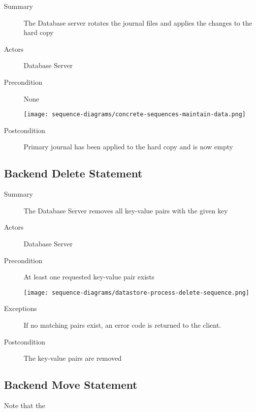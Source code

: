\documentclass[a4paper]{report}
\begin{document}
	\begin{description}
		\item[Summary] The Database server rotates the journal files and applies the changes to the hard copy
		\item[Actors] Database Server
		\item[Precondition] None

		\begin{center}
			\texttt{[image: sequence-diagrams/concrete-sequences-maintain-data.png]}
		\end{center}

		\item[Postcondition] Primary journal has been applied to the hard copy and is now empty
	\end{description}

	\pagebreak
	
	\subsection{Backend Delete Statement}

	\begin{description}
		\item[Summary] The Database Server removes all key-value pairs with the given key
		\item[Actors] Database Server
		\item[Precondition] At least one requested key-value pair exists

		\begin{center}
			\texttt{[image: sequence-diagrams/datastore-process-delete-sequence.png]}
		\end{center}

		\item[Exceptions] If no matching pairs exist, an error code is returned to the client.
		\item[Postcondition] The key-value pairs are removed
	\end{description}
	
	\pagebreak

	\subsection{Backend Move Statement}

	Note that the 
\end{document}

